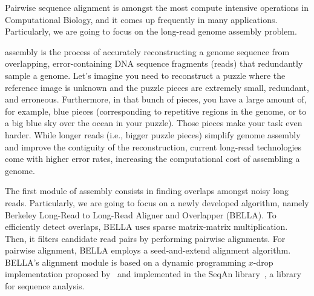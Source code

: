\justify
Pairwise sequence alignment is amongst the most compute intensive operations in Computational Biology, and it comes up frequently in many applications. 
Particularly, we are going to focus on the \denovo long-read genome assembly problem.

\Denovo assembly is the process of accurately reconstructing a genome sequence from overlapping, error-containing DNA sequence fragments (reads) that redundantly sample a genome. 
Let's imagine you need to reconstruct a puzzle where the reference image is unknown and the puzzle pieces are extremely small, redundant, and erroneous. 
Furthermore, in that bunch of pieces, you have a large amount of, for example, blue pieces (corresponding to repetitive regions in the genome, or to a big blue sky over the ocean in your puzzle).
Those pieces make your task even harder. While longer reads (i.e., bigger puzzle pieces) simplify genome assembly and improve the contiguity of the reconstruction, current long-read technologies come with higher error rates, increasing the computational cost of assembling a genome.

The first module of \denovo assembly consists in finding overlaps amongst noisy long reads.
Particularly, we are going to focus on a newly developed algorithm, namely Berkeley Long-Read to Long-Read Aligner and Overlapper (BELLA).
To efficiently detect overlaps, BELLA uses sparse matrix-matrix multiplication. 
Then, it filters candidate read pairs by performing pairwise alignments.
For pairwise alignment, BELLA employs a seed-and-extend alignment algorithm. BELLA's alignment module is based on a dynamic programming $x$-drop implementation proposed by~ and implemented in the SeqAn library~, a \CC library for sequence analysis. 


